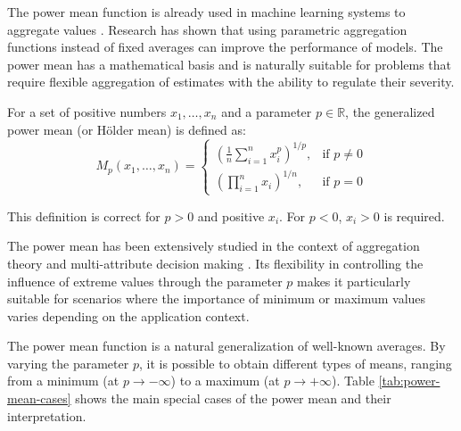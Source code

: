 \documentclass[sn-basic]{sn-jnl}
\theoremstyle{thmstyleone}%
\theoremstyle{thmstyletwo}%
\theoremstyle{thmstylethree}%
\begin{document}
The power mean function is already used in machine learning systems to aggregate values \cite{Kortvelesy2023,Derr2024}. Research has shown that using parametric aggregation functions instead of fixed averages can improve the performance of models. The power mean has a mathematical basis and is naturally suitable for problems that require flexible aggregation of estimates with the ability to regulate their severity.

For a set of positive numbers $x_1, \ldots, x_n$ and a parameter $p \in \mathbb{R}$, the generalized power mean (or Hölder mean) is defined as:
\begin{equation}
\label{eq:power-mean}
M_p(x_1, \ldots, x_n) = \begin{cases} 
\left( \frac{1}{n} \displaystyle\sum_{i=1}^n x_i^p \right)^{1/p}, & \text{if } p \neq 0 \\
\left( \prod_{i=1}^n x_i \right)^{1/n}, & \text{if } p = 0
\end{cases}
\end{equation}

This definition is correct for $p > 0$ and positive $x_i$. For $p < 0$, $x_i > 0$ is required.

The power mean has been extensively studied in the context of aggregation theory and multi-attribute decision making \cite{Hwang1981}. Its flexibility in controlling the influence of extreme values through the parameter $p$ makes it particularly suitable for scenarios where the importance of minimum or maximum values varies depending on the application context.

The power mean function is a natural generalization of well-known averages. By varying the parameter $p$, it is possible to obtain different types of means, ranging from a minimum (at $p \to -\infty$) to a maximum (at $p \to +\infty$). Table \ref{tab:power-mean-cases} shows the main special cases of the power mean and their interpretation.
\end{document}
